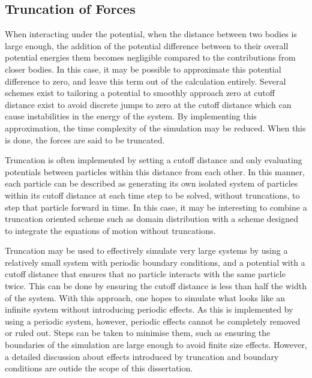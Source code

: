 \subsection{Truncation of Forces}

%
When interacting under the \LennardJones{} potential,
when the distance between two bodies is large enough,
the addition of the potential difference between to their overall
potential energies them becomes negligible compared
to the contributions from closer bodies.
%
In this case, it may be possible to approximate this potential difference
to zero, and leave this term out of the calculation entirely.
%
Several schemes exist to tailoring a potential to smoothly approach zero at
cutoff distance exist to avoid discrete jumps to zero at
the cutoff distance which can cause instabilities
in the energy of the system.
%
By implementing this approximation,
the time complexity of the simulation may be reduced.
%
When this is done, the forces are said to be truncated.

%
Truncation is often implemented by
setting a cutoff distance and only evaluating potentials
between particles within this distance from each other.
%
In this manner, each particle can be described as generating its own
isolated system of particles within its cutoff distance
at each time step
to be solved, without truncations, to step that particle forward in time.
%
In this case, it may be interesting to combine a truncation oriented
scheme such as domain distribution with a scheme designed to integrate
the equations of motion without truncations.

%
Truncation may be used to effectively simulate very large systems by using
a relatively small system with periodic boundary conditions,
and a potential with a cutoff distance that ensures that
no particle interacts with the same particle twice.
%
This can be done by ensuring the cutoff distance is less than half the width
of the system.
%
With this approach, one hopes to simulate what looks like an infinite system
without introducing periodic effects.
%
As this is implemented by using a periodic system, however,
periodic effects cannot be completely removed or ruled out.
%
Steps can be taken to minimise them, such as ensuring the boundaries
of the simulation are large enough to avoid finite size effects.
%
However, a detailed discussion about effects introduced by
truncation and boundary conditions are outide the scope of
this dissertation.

